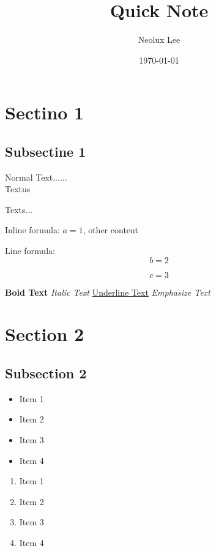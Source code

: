 \documentclass[hyperref,a4paper,UTF8]{ctexart}
\title{Quick Note}
\author{Neolux Lee}
\date{\today}
\begin{document}
\maketitle %
\tableofcontents %

\newpage %

\section{Sectino 1} %
\subsection{Subsectine 1} %

Normal Text...... \\ %
Textus  

Texts...

Inline formula: $a=1$, other content %


Line formula: 
\[
    b=2 %
\]

\begin{equation}
    c=3 %
\end{equation}

\textbf{Bold Text} %
\textit{Italic Text} %
\underline{Underline Text} %
\emph{Emphasize Text} %

\section{Section 2}
\subsection{Subsection 2}

\begin{itemize} %
    \item Item 1
    \item Item 2
    \item Item 3
    \item Item 4
\end{itemize}

\begin{enumerate} %
    \item Item 1
    \item Item 2
    \item Item 3
    \item Item 4
\end{enumerate}
\end{document}
